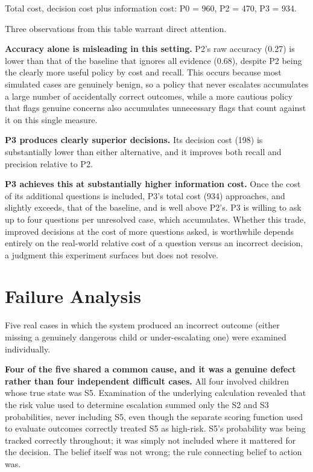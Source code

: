 \documentclass{article}
\begin{document}
Total cost, decision cost plus information cost: P0 = 960, P2 = 470, P3
= 934.

Three observations from this table warrant direct attention.

\textbf{Accuracy alone is misleading in this setting.} P2's raw accuracy
(0.27) is lower than that of the baseline that ignores all evidence
(0.68), despite P2 being the clearly more useful policy by cost and
recall. This occurs because most simulated cases are genuinely benign,
so a policy that never escalates accumulates a large number of
accidentally correct outcomes, while a more cautious policy that flags
genuine concerns also accumulates unnecessary flags that count against
it on this single measure.

\textbf{P3 produces clearly superior decisions.} Its decision cost (198)
is substantially lower than either alternative, and it improves both
recall and precision relative to P2.

\textbf{P3 achieves this at substantially higher information cost.} Once
the cost of its additional questions is included, P3's total cost (934)
approaches, and slightly exceeds, that of the baseline, and is well
above P2's. P3 is willing to ask up to four questions per unresolved
case, which accumulates. Whether this trade, improved decisions at the
cost of more questions asked, is worthwhile depends entirely on the
real-world relative cost of a question versus an incorrect decision, a
judgment this experiment surfaces but does not resolve.

\hypertarget{failure-analysis}{%
\section{Failure Analysis}\label{failure-analysis}}

Five real cases in which the system produced an incorrect outcome
(either missing a genuinely dangerous child or under-escalating one)
were examined individually.

\textbf{Four of the five shared a common cause, and it was a genuine
defect rather than four independent difficult cases.} All four involved
children whose true state was S5. Examination of the underlying
calculation revealed that the risk value used to determine escalation
summed only the S2 and S3 probabilities, never including S5, even though
the separate scoring function used to evaluate outcomes correctly
treated S5 as high-risk. S5's probability was being tracked correctly
throughout; it was simply not included where it mattered for the
decision. The belief itself was not wrong; the rule connecting belief to
action was.
\end{document}
